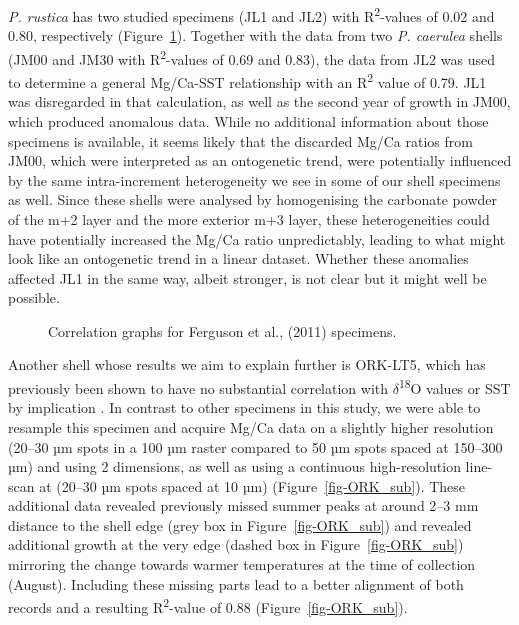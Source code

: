 \documentclass[
  authoryear,
  preprint,
  3p]{elsarticle}
\begin{document}
\emph{P. rustica} has two studied specimens (JL1 and JL2) with
R\textsuperscript{2}-values of 0.02 and 0.80, respectively
\citep{Ferguson2011-zl} (Figure~\ref{fig-Ferg}). Together with the data
from two \emph{P. caerulea} shells (JM00 and JM30 with
R\textsuperscript{2}-values of 0.69 and 0.83), the data from JL2 was
used to determine a general Mg/Ca-SST relationship with an
R\textsuperscript{2} value of 0.79. JL1 was disregarded in that
calculation, as well as the second year of growth in JM00, which
produced anomalous data. While no additional information about those
specimens is available, it seems likely that the discarded Mg/Ca ratios
from JM00, which were interpreted as an ontogenetic trend, were
potentially influenced by the same intra-increment heterogeneity we see
in some of our shell specimens as well. Since these shells were analysed
by homogenising the carbonate powder of the m+2 layer and the more
exterior m+3 layer, these heterogeneities could have potentially
increased the Mg/Ca ratio unpredictably, leading to what might look like
an ontogenetic trend in a linear dataset. Whether these anomalies
affected JL1 in the same way, albeit stronger, is not clear but it might
well be possible.

\begin{figure}


\caption{\label{fig-Ferg}Correlation graphs for Ferguson et al., (2011)
specimens.}

\end{figure}%

Another shell whose results we aim to explain further is ORK-LT5, which
has previously been shown to have no substantial correlation with
\(\delta\)\textsuperscript{18}O values or SST by implication
\citep{Graniero2017-io}. In contrast to other specimens in this study,
we were able to resample this specimen and acquire Mg/Ca data on a
slightly higher resolution (20--30 µm spots in a 100 µm raster compared
to 50 µm spots spaced at 150--300 µm) and using 2 dimensions, as well as
using a continuous high-resolution line-scan at (20--30 µm spots spaced
at 10 µm) (Figure~\ref{fig-ORK_sub}). These additional data revealed
previously missed summer peaks at around 2--3 mm distance to the shell
edge (grey box in Figure~\ref{fig-ORK_sub}) and revealed additional
growth at the very edge (dashed box in Figure~\ref{fig-ORK_sub})
mirroring the change towards warmer temperatures at the time of
collection (August). Including these missing parts lead to a better
alignment of both records and a resulting R\textsuperscript{2}-value of
0.88 (Figure~\ref{fig-ORK_sub}).
\end{document}
